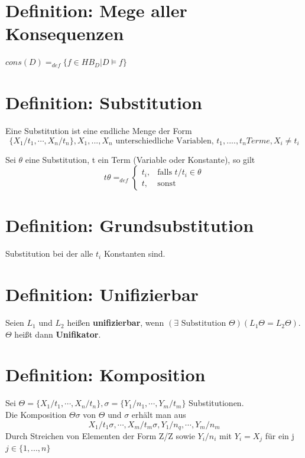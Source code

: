 \documentclass[12pt, a4paper]{article}
\begin{document}
\section*{Definition: Mege aller Konsequenzen}
$cons(D) =_{def} \{ f \in HB_D | D \vDash f \}$

\section*{Definition: Substitution}
Eine Substitution ist eine endliche Menge der Form
\begin{equation}
\{ X_1 / t_1, \cdots, X_n / t_n \}, X_1,...,X_n \text{ unterschiedliche Variablen, } t_1,....,t_n Terme, X_i \neq t_i
\end{equation}

Sei $\theta$ eine Substitution, t ein Term (Variable oder Konstante), so gilt \\

\begin{equation}
t\theta =_{def} \begin{cases} t_i, & \mbox{falls } t/t_i \in \theta \\ t, & \mbox{sonst} \end{cases}
\end{equation}

\section*{Definition: Grundsubstitution}
Substitution bei der alle $t_i$ Konstanten sind.

\section*{Definition: Unifizierbar}
Seien $L_1$ und $L_2$ heißen \textbf{unifizierbar}, wenn $(\exists \text{ Substitution } \Theta)(L_1\Theta = L_2\Theta)$. $\Theta$ heißt dann \textbf{Unifikator}.

\section*{Definition: Komposition}
Sei $\Theta = \{ X_1 / t_1, \cdots, X_n / t_n \}, \sigma = \{ Y_1 / n_1, \cdots, Y_m / t_m \}$ Substitutionen. \\
Die Komposition $\Theta\sigma$ von $\Theta$ und $\sigma$ erhält man aus 
\begin{equation}
X_1 / t_1\sigma, \cdots, X_m / t_m\sigma, Y_1 / n_q, \cdots, Y_m / n_m
\end{equation}
Durch Streichen von Elementen der Form Z/Z sowie $Y_i / n_i$ mit $Y_i = X_j$ für ein j$j \in \{1, ..., n\}$
\end{document}
